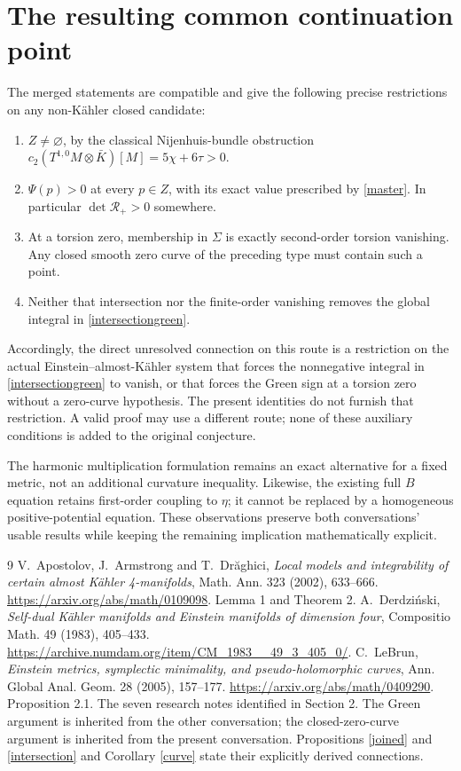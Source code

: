 \documentclass[11pt]{article}
\newcommand{\RR}{\mathcal R_+}
\begin{document}
\section{The resulting common continuation point}
The merged statements are compatible and give the following precise
restrictions on any non-K\"ahler closed candidate:
\begin{enumerate}
\item $Z\ne\varnothing$, by the classical Nijenhuis-bundle obstruction
$c_2(T^{1,0}M\otimes\bar K)[M]=5\chi+6\tau>0$.
\item $\Psi(p)>0$ at every $p\in Z$, with its exact value prescribed by
\eqref{master}. In particular $\det\RR>0$ somewhere.
\item At a torsion zero, membership in $\Sigma$ is exactly second-order
torsion vanishing. Any closed smooth zero curve of the preceding type
must contain such a point.
\item Neither that intersection nor the finite-order vanishing removes
the global integral in \eqref{intersectiongreen}.
\end{enumerate}
Accordingly, the direct unresolved connection on this route is a
restriction on the actual Einstein--almost-K\"ahler system that forces
the nonnegative integral in \eqref{intersectiongreen} to vanish, or that
forces the Green sign at a torsion zero without a zero-curve hypothesis.
The present identities do not furnish that restriction. A valid proof
may use a different route; none of these auxiliary conditions is added
to the original conjecture.

The harmonic multiplication formulation remains an exact alternative
for a fixed metric, not an additional curvature inequality. Likewise,
the existing full $B$ equation retains first-order coupling to $\eta$;
it cannot be replaced by a homogeneous positive-potential equation.
These observations preserve both conversations' usable results while
keeping the remaining implication mathematically explicit.

\begin{thebibliography}{9}
 V.~Apostolov, J.~Armstrong and T.~Dr\u aghici,
\emph{Local models and integrability of certain almost K\"ahler
4-manifolds}, Math. Ann. 323 (2002), 633--666.
\url{https://arxiv.org/abs/math/0109098}. Lemma 1 and Theorem 2.
 A.~Derdzi\'nski,
\emph{Self-dual K\"ahler manifolds and Einstein manifolds of dimension four},
Compositio Math. 49 (1983), 405--433.
\url{https://archive.numdam.org/item/CM_1983__49_3_405_0/}.
 C.~LeBrun,
\emph{Einstein metrics, symplectic minimality, and pseudo-holomorphic curves},
Ann. Global Anal. Geom. 28 (2005), 157--177.
\url{https://arxiv.org/abs/math/0409290}. Proposition 2.1.
 The seven research notes identified in Section 2.
The Green argument is inherited from the other conversation; the
closed-zero-curve argument is inherited from the present conversation.
Propositions \ref{joined} and \ref{intersection} and
Corollary \ref{curve} state their explicitly derived connections.
\end{thebibliography}
\end{document}
